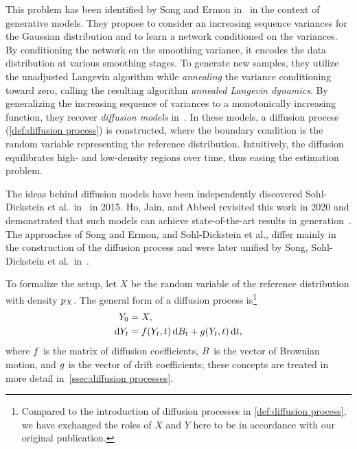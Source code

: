 This problem has been identified by Song and Ermon in~\cite{song_generative_2019} in the context of generative models.
They propose to consider an increasing sequence variances for the Gaussian distribution and to learn a network conditioned on the variances.
By conditioning the network on the smoothing variance, it encodes the data distribution at various smoothing stages.
To generate new samples, they utilize the unadjusted Langevin algorithm while \emph{annealing} the variance conditioning toward zero, calling the resulting algorithm \emph{annealed Langevin dynamics}.
By generalizing the increasing sequence of variances to a monotonically increasing function, they recover \emph{diffusion models} in~\cite{song_scorebased_2021}.
In these models, a diffusion process (\cref{def:diffusion process}) is constructed, where the boundary condition is the random variable representing the reference distribution.
Intuitively, the diffusion equilibrates high- and low-density regions over time, thus easing the estimation problem.

The ideas behind diffusion models have been independently discovered Sohl-Dickstein et al.\ in~\cite{sohl-dickstein15} in 2015.
Ho, Jain, and Abbeel revisited this work in 2020 and demonstrated that such models can achieve state-of-the-art results in generation~\cite{ho_ddpm_2020}.
The approaches of Song and Ermon, and Sohl-Dickstein et al., differ mainly in the construction of the diffusion process and were later unified by Song, Sohl-Dickstein et al.\ in~\cite{song_scorebased_2021}.

To formalize the setup, let \( X \) be the random variable of the reference distribution with density \( p_X \).
The general form of a diffusion process is\footnote{%
	Compared to the introduction of diffusion processes in \cref{def:diffusion process}, we have exchanged the roles of \( X \) and \( Y \) here to be in accordance with our original publication.
}
\begin{equation}
	\begin{aligned}
		Y_{\num{0}} &= X, \\
		\mathrm{d}Y_t &= f(Y_t, t)\,\mathrm{d}B_t + g(Y_t, t)\,\mathrm{d}t,
	\end{aligned}
\end{equation}
where \( f \) is the matrix of diffusion coefficients, \( B \) is the vector of Brownian motion, and \( g \) is the vector of drift coefficients;
these concepts are treated in more detail in~\cref{ssec:diffusion processes}.

